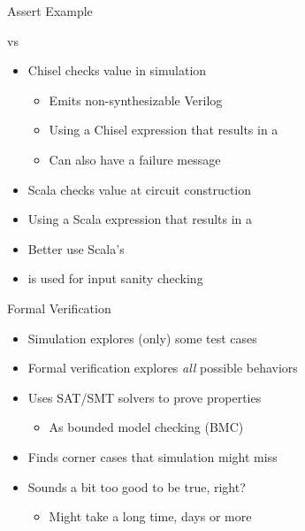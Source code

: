 \begin{frame}[fragile]{Assert Example}
\end{frame}

\begin{frame}[fragile]{ vs }
\begin{itemize}
\item Chisel  checks value in simulation
\begin{itemize}
\item Emits non-synthesizable Verilog
\item Using a Chisel expression that results in a 
\item Can also have a failure message
\end{itemize}
\item Scala  checks value at circuit construction
\item Using a Scala expression that results in a 
\item Better use Scala's 
\item {} is used for input sanity checking
\end{itemize}
\end{frame}


\begin{frame}[fragile]{Formal Verification}
\begin{itemize}
\item Simulation explores (only) some test cases
\item Formal verification explores \emph{all} possible behaviors
\item Uses SAT/SMT solvers to prove properties
\begin{itemize}
\item As bounded model checking (BMC)
\end{itemize}
\item Finds corner cases that simulation might miss
\item Sounds a bit too good to be true, right?
\begin{itemize}
\item Might take a long time, days or more
\end{itemize}
\end{itemize}
\end{frame}

